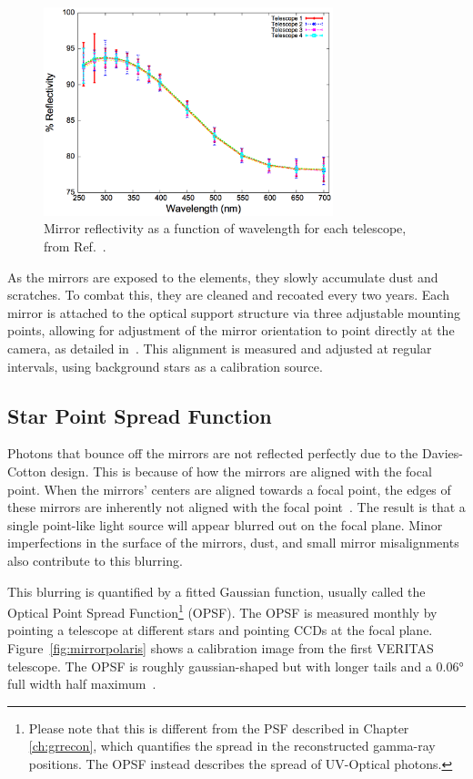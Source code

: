 \begin{figure}[ht]
  \centering
  \includegraphics[width=0.75\textwidth]{images/mirror_reflect}
  \caption[Mirror Reflectivity]{
    Mirror reflectivity as a function of wavelength for each telescope, from Ref.~\cite{mirrorfacets}. 
  }
  \label{fig:mirreflect}
\end{figure}

As the mirrors are exposed to the elements, they slowly accumulate dust and scratches.
To combat this, they are cleaned and recoated every two years.
Each mirror is attached to the optical support structure via three adjustable mounting points, allowing for adjustment of the mirror orientation to point directly at the camera, as detailed in~\cite{mirroralign}.
This alignment is measured and adjusted at regular intervals, using background stars as a calibration source.

\subsection{Star Point Spread Function}

Photons that bounce off the mirrors are not reflected perfectly due to the Davies-Cotton design.
This is because of how the mirrors are aligned with the focal point.
When the mirrors' centers are aligned towards a focal point, the edges of these mirrors are inherently not aligned with the focal point~\cite{daviscotton_optical}.
The result is that a single point-like light source will appear blurred out on the focal plane.
Minor imperfections in the surface of the mirrors, dust, and small mirror misalignments also contribute to this blurring.

This blurring is quantified by a fitted Gaussian function, usually called the Optical Point Spread Function\footnote{Please note that this is different from the PSF described in Chapter \ref{ch:grrecon}, which quantifies the spread in the reconstructed gamma-ray positions.  The OPSF instead describes the spread of UV-Optical photons.} (OPSF).
The OPSF is measured monthly by pointing a telescope at different stars and pointing CCDs at the focal plane.
Figure~\ref{fig:mirrorpolaris} shows a calibration image from the first VERITAS telescope.
The OPSF is roughly gaussian-shaped but with longer tails and a $ \ang{0.06} $ full width half maximum~\cite{Veritas_Detector}.

